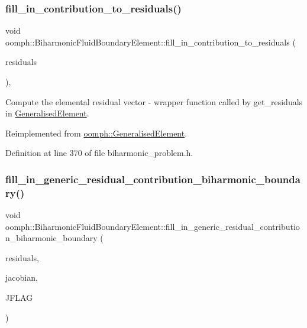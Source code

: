 \subsubsection{\texorpdfstring{fill\+\_\+in\+\_\+contribution\+\_\+to\+\_\+residuals()}{fill\_in\_contribution\_to\_residuals()}}
{\footnotesize\ttfamily void oomph\+::\+Biharmonic\+Fluid\+Boundary\+Element\+::fill\+\_\+in\+\_\+contribution\+\_\+to\+\_\+residuals (\begin{DoxyParamCaption}\item[{\hyperlink{classoomph_1_1Vector}{Vector}$<$ double $>$ \&}]{residuals }\end{DoxyParamCaption})\hspace{0.3cm}{\ttfamily [inline]}, {\ttfamily [virtual]}}



Compute the elemental residual vector -\/ wrapper function called by get\+\_\+residuals in \hyperlink{classoomph_1_1GeneralisedElement}{Generalised\+Element}. 



Reimplemented from \hyperlink{classoomph_1_1GeneralisedElement_a310c97f515e8504a48179c0e72c550d7}{oomph\+::\+Generalised\+Element}.



Definition at line 370 of file biharmonic\+\_\+problem.\+h.

\mbox{\label{classoomph_1_1BiharmonicFluidBoundaryElement_acb845b4b7fe946233d9f656754fa3eac}} 
\subsubsection{\texorpdfstring{fill\+\_\+in\+\_\+generic\+\_\+residual\+\_\+contribution\+\_\+biharmonic\+\_\+boundary()}{fill\_in\_generic\_residual\_contribution\_biharmonic\_boundary()}}
{\footnotesize\ttfamily void oomph\+::\+Biharmonic\+Fluid\+Boundary\+Element\+::fill\+\_\+in\+\_\+generic\+\_\+residual\+\_\+contribution\+\_\+biharmonic\+\_\+boundary (\begin{DoxyParamCaption}\item[{\hyperlink{classoomph_1_1Vector}{Vector}$<$ double $>$ \&}]{residuals,  }\item[{\hyperlink{classoomph_1_1DenseMatrix}{Dense\+Matrix}$<$ double $>$ \&}]{jacobian,  }\item[{unsigned}]{J\+F\+L\+AG }\end{DoxyParamCaption})\hspace{0.3cm}{\ttfamily [virtual]}}



